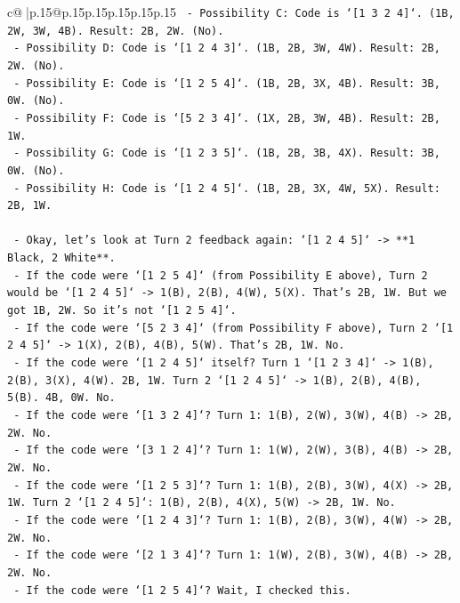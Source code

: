 \documentclass{article}
\begin{document}
{\begin{supertabular}{c@{$\;$}|p{.15\linewidth}@{}p{.15\linewidth}p{.15\linewidth}p{.15\linewidth}p{.15\linewidth}p{.15\linewidth}}
{{{\texttt{        {-} Possibility C: Code is `{[}1 3 2 4{]}`. (1B, 2W, 3W, 4B). Result: 2B, 2W. (No).} \\
\texttt{        {-} Possibility D: Code is `{[}1 2 4 3{]}`. (1B, 2B, 3W, 4W). Result: 2B, 2W. (No).} \\
\texttt{        {-} Possibility E: Code is `{[}1 2 5 4{]}`. (1B, 2B, 3X, 4B). Result: 3B, 0W. (No).} \\
\texttt{        {-} Possibility F: Code is `{[}5 2 3 4{]}`. (1X, 2B, 3W, 4B). Result: 2B, 1W.} \\
\texttt{        {-} Possibility G: Code is `{[}1 2 3 5{]}`. (1B, 2B, 3B, 4X). Result: 3B, 0W. (No).} \\
\texttt{        {-} Possibility H: Code is `{[}1 2 4 5{]}`. (1B, 2B, 3X, 4W, 5X). Result: 2B, 1W.} \\
\\ 
\texttt{    {-} Okay, let's look at Turn 2 feedback again: `{[}1 2 4 5{]}` {-}> **1 Black, 2 White**.} \\
\texttt{        {-} If the code were `{[}1 2 5 4{]}` (from Possibility E above), Turn 2 would be `{[}1 2 4 5{]}` {-}> 1(B), 2(B), 4(W), 5(X). That's 2B, 1W. But we got 1B, 2W. So it's not `{[}1 2 5 4{]}`.} \\
\texttt{        {-} If the code were `{[}5 2 3 4{]}` (from Possibility F above), Turn 2 `{[}1 2 4 5{]}` {-}> 1(X), 2(B), 4(B), 5(W). That's 2B, 1W. No.} \\
\texttt{        {-} If the code were `{[}1 2 4 5{]}` itself? Turn 1 `{[}1 2 3 4{]}` {-}> 1(B), 2(B), 3(X), 4(W). 2B, 1W. Turn 2 `{[}1 2 4 5{]}` {-}> 1(B), 2(B), 4(B), 5(B). 4B, 0W. No.} \\
\texttt{        {-} If the code were `{[}1 3 2 4{]}`? Turn 1: 1(B), 2(W), 3(W), 4(B) {-}> 2B, 2W. No.} \\
\texttt{        {-} If the code were `{[}3 1 2 4{]}`? Turn 1: 1(W), 2(W), 3(B), 4(B) {-}> 2B, 2W. No.} \\
\texttt{        {-} If the code were `{[}1 2 5 3{]}`? Turn 1: 1(B), 2(B), 3(W), 4(X) {-}> 2B, 1W. Turn 2 `{[}1 2 4 5{]}`: 1(B), 2(B), 4(X), 5(W) {-}> 2B, 1W. No.} \\
\texttt{        {-} If the code were `{[}1 2 4 3{]}`? Turn 1: 1(B), 2(B), 3(W), 4(W) {-}> 2B, 2W. No.} \\
\texttt{        {-} If the code were `{[}2 1 3 4{]}`? Turn 1: 1(W), 2(B), 3(W), 4(B) {-}> 2B, 2W. No.} \\
\texttt{        {-} If the code were `{[}1 2 5 4{]}`? Wait, I checked this.} \\
}}}
\end{supertabular}}
\end{document}
